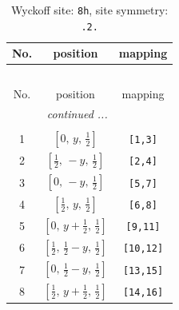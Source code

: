 \documentclass[fleqn,8pt]{jsarticle}
\begin{document}
\begin{longtable}{ccc}
\caption{Wyckoff site: {\tt 8h}, site symmetry: {\tt .2.}}
 \\
 \hline \hline
No. & position & mapping \\ \hline \endfirsthead

\multicolumn{2}{l}{\tablename\ \thetable{}} \\
 \hline \hline
No. & position & mapping \\ \hline \endhead

 \hline \hline
\multicolumn{2}{r}{\footnotesize\it continued ...} \\ \endfoot

 \hline \hline
\multicolumn{2}{r}{} \\ \endlastfoot

1 & $\left[ 0,\, y,\, \frac{1}{2} \right]$ & {\tt [1,3]} \\ \hline
2 & $\left[ \frac{1}{2},\, - y,\, \frac{1}{2} \right]$ & {\tt [2,4]} \\ \hline
3 & $\left[ 0,\, - y,\, \frac{1}{2} \right]$ & {\tt [5,7]} \\ \hline
4 & $\left[ \frac{1}{2},\, y,\, \frac{1}{2} \right]$ & {\tt [6,8]} \\ \hline
5 & $\left[ 0,\, y + \frac{1}{2},\, \frac{1}{2} \right]$ & {\tt [9,11]} \\ \hline
6 & $\left[ \frac{1}{2},\, \frac{1}{2} - y,\, \frac{1}{2} \right]$ & {\tt [10,12]} \\ \hline
7 & $\left[ 0,\, \frac{1}{2} - y,\, \frac{1}{2} \right]$ & {\tt [13,15]} \\ \hline
8 & $\left[ \frac{1}{2},\, y + \frac{1}{2},\, \frac{1}{2} \right]$ & {\tt [14,16]} \\
\end{longtable}
\renewcommand{\arraystretch}{1.2}
\end{document}
